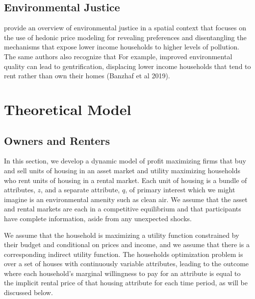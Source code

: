 \documentclass[ecta,nameyear,draft]{econsocart}
\theoremstyle{plain}
\theoremstyle{remark}
\begin{document}
\subsection{Environmental Justice} 
\cite{banzhafJustice19} provide an overview of environmental justice in a spatial context that focuses on the use of hedonic price modeling for revealing preferences and disentangling the mechanisms that expose lower income households to higher levels of pollution. The same authors also recognize that For example, improved environmental quality can lead to gentrification, displacing lower income households that tend to rent rather than own their homes (Banzhaf et al 2019). 	 





\section{Theoretical Model}
\subsection{Owners and Renters}
In this section, we develop a dynamic model of profit maximizing firms that buy and sell units of housing in an asset market and utility maximizing households who rent units of housing in a rental market. Each unit of housing is a bundle of attributes, $z$, and a separate attribute, $q$, of primary interest which we might imagine is an environmental amenity such as clean air. We assume that the asset and rental markets are each in a competitive equilibrium and that participants have complete information, aside from any unexpected shocks.

We assume that the household is maximizing a utility function constrained by their budget and conditional on prices and income, and we assume that there is a corresponding indirect utility function. The households optimization problem is over a set of houses with continuously variable attributes, leading to the outcome where each household's marginal willingness to pay for an attribute is equal to the implicit rental price of that housing attribute for each time period, as will be discussed below.
\end{document}
